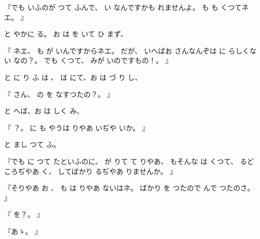 『でも
いふのが
つて
ふんで、
い
なんですかも
れませんよ。
も
も
くつてネエ。
』

と
やかに
る。
お
は
を
いて
ひ
まず、

『
ネエ、
も
が
いんですからネエ。
だが、
いへばお
さんなんぞは
に
らしくない
なの？。
でも
くつて、
みが
いのですもの！。
』

と
に
り
ふ
は
、
は
にて、お
は
づ
り
し、

『
さん、
の
を
なすつたの？。
』

と
へば、お
は
しく
み、

『
？。
に
も
やうは
りやあ
いぢや
いか。
』

と
まし
つて
ふ。

『でも
に
つて
たといふのに、
が
りて
て
りやあ、
もそんな
は
くつて、
るどころぢやあ
く、
してばかり
るぢやあ
りませんか。
』

『そりやあ
お
、
も
は
りやあ
ないはネ。
ばかり
を
つたので
んで
つたのさ。
』

『
を？。
』

『あゝ。
』

